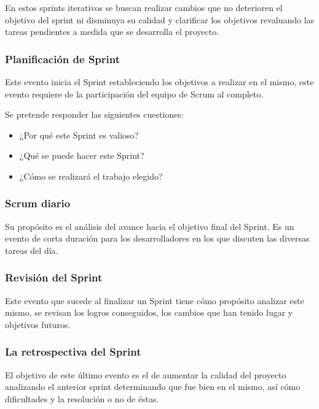 En estos sprints iterativos se buscan realizar cambios que no deterioren el objetivo del sprint ni disminuya su calidad y clarificar los objetivos revaluando las tareas pendientes a medida que se desarrolla el proyecto.

\subsubsection{Planificación de Sprint}

Este evento inicia el Sprint estableciendo los objetivos a realizar en el mismo, este evento requiere de la participación del equipo de Scrum al completo.

Se pretende responder las siguientes cuestiones:

\begin{itemize}

    \item ¿Por qué este Sprint es valioso?
    \item ¿Qué se puede hacer este Sprint?
    \item ¿Cómo se realizará el trabajo elegido?

\end{itemize}

\subsubsection{Scrum diario}

Su propósito es el análisis del avance hacia el objetivo final del Sprint.
Es un evento de corta duración para los desarrolladores en los que discuten las diversas tareas del día.

\subsubsection{Revisión del Sprint}

Este evento que sucede al finalizar un Sprint tiene cómo propósito analizar este mismo, se revisan los logros conseguidos, los cambios que han tenido lugar y objetivos futuros.

\subsubsection{La retrospectiva del Sprint}

El objetivo de este último evento es el de aumentar la calidad del proyecto analizando el anterior sprint determinando que fue bien en el mismo, así cómo dificultades y la resolución o no de éstas.

